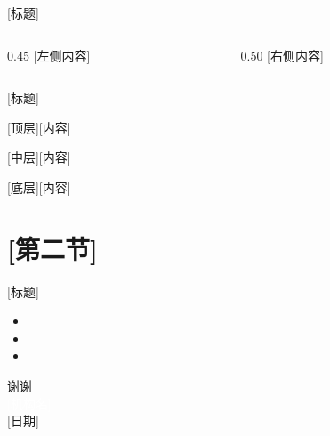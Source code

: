 \documentclass[aspectratio=169, 10pt]{beamer}
\begin{document}
\begin{frame}{[标题]}
  \begin{columns}[c]
    \begin{column}{0.45\textwidth}
      [左侧内容]
    \end{column}
    \begin{column}{0.50\textwidth}
      [右侧内容]
    \end{column}
  \end{columns}
\end{frame}

\begin{frame}{[标题]}
  \begin{block}{[顶层]}\small [内容]\end{block}
  \vspace{0.3em}
  \begin{alertblock}{[中层]}\small [内容]\end{alertblock}
  \vspace{0.3em}
  \begin{exampleblock}{[底层]}\small [内容]\end{exampleblock}
\end{frame}

\section{[第二节]}

\begin{frame}{[标题]}
  \begin{itemize}
    \item [要点1]
    \item [要点2]
    \item [要点3]
  \end{itemize}
\end{frame}

{
  \begin{frame}[standout]
    \textcolor{tealAccent}{\Large 谢谢}\\[0.5em]
    \textcolor{white}{\small [机构名]}\\
    \textcolor{white!60}{\footnotesize [日期]}
  \end{frame}
}
\end{document}
